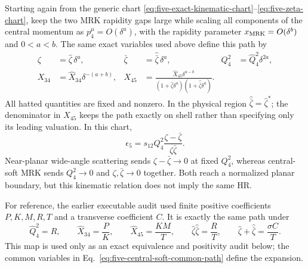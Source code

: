 \documentclass[a4paper,11pt]{article}
\begin{document}
Starting again from the generic chart
\eqref{eq:five-exact-kinematic-chart}--\eqref{eq:five-zeta-chart}, keep the
two MRK rapidity gaps large while scaling all components of the central
momentum as \(p_4^\mu=O(\delta^a)\), with the rapidity parameter
\(x_{\rm MRK}=O(\delta^b)\) and \(0<a<b\).  The same exact variables used
above define this path by
\begin{align}
 \zeta&=\widehat\zeta\,\delta^a,&
 \bar\zeta&=\widehat{\bar\zeta}\,\delta^a,&
 Q_4^2&=\widehat Q_4^2\delta^{2a},\nonumber\\
 X_{34}&=\widehat X_{34}\delta^{-(a+b)},&
 X_{45}&=
 \frac{\widehat X_{45}\delta^{a-b}}
 {(1+\widehat\zeta\delta^a)
  (1+\widehat{\bar\zeta}\delta^a)}.
 \label{eq:five-central-soft-common-path}
\end{align}
All hatted quantities are fixed and nonzero.  In the physical region
\(\widehat{\bar\zeta}=\widehat\zeta^*\); the denominator in \(X_{45}\)
keeps the path exactly on shell rather than specifying only its leading
valuation.  In this chart,
\begin{equation}
 \epsilon_5=s_{12}Q_4^2
 \frac{\zeta-\bar\zeta}{\zeta\bar\zeta}.
 \label{eq:five-central-soft-gram}
\end{equation}
Near-planar wide-angle scattering sends \(\zeta-\bar\zeta\to0\) at fixed
\(Q_4^2\), whereas central-soft MRK sends
\(Q_4^2\to0\) and \(\zeta,\bar\zeta\to0\) together.  Both reach a normalized
planar boundary, but this kinematic relation does not imply the same HR.

For reference, the earlier executable audit used finite positive
coefficients \(P,K,M,R,T\) and a transverse coefficient \(C\).  It is
exactly the same path under
\begin{equation}
 \widehat Q_4^2=R,\qquad
 \widehat X_{34}=\frac PK,\qquad
 \widehat X_{45}=\frac{KM}{T},\qquad
 \widehat\zeta\widehat{\bar\zeta}=\frac RT,\qquad
 \widehat\zeta+\widehat{\bar\zeta}=\frac{\sigma C}{T}.
 \label{eq:five-central-soft-old-chart-map}
\end{equation}
This map is used only as an exact equivalence and positivity audit below;
the common variables in Eq.~\eqref{eq:five-central-soft-common-path} define
the expansion.
\end{document}
